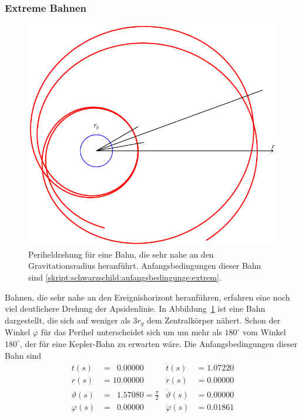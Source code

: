 \subsubsection{Extreme Bahnen}
\begin{figure}
\centering
\includegraphics{chapters/tikz/orbit2.pdf}
\caption{Periheldrehung für eine Bahn, die sehr nahe an den Gravitationsradius
heranführt.
Anfangsbedingungen dieser Bahn sind
\eqref{skript:schwarzschild:anfangsbedingunge:extrem}.
\label{skript:schwarzschild:apside:extrem}}
\end{figure}
Bahnen, die sehr nahe an den Ereignishorizont heranführen, erfahren eine
noch viel deutlichere Drehung der Apsidenlinie.
In Abbildung~\ref{skript:schwarzschild:apside:extrem}
ist eine Bahn dargestellt, die sich auf weniger als $3r_g$ dem Zentralkörper
nähert.
Schon der Winkel $\varphi$ für das Perihel unterscheidet sich um um mehr
als $180^\circ$ vom Winkel $180^\circ$, der für eine Kepler-Bahn zu
erwarten wäre.
Die Anfangsbedingungen dieser Bahn sind
\begin{equation}
\begin{aligned}
t(s)        &=\phantom{0}0.00000                    &\dot t(s)         &= 1.07220\\
r(s)        &=          10.00000                    &\dot r(s)         &= 0.00000\\
\vartheta(s)&=\phantom{0}1.57080=\textstyle\frac\pi2&\dot \vartheta(s) &= 0.00000\\
\varphi(s)  &=\phantom{0}0.00000                    &\dot \varphi(s)   &= 0.01861
\end{aligned}
\label{skript:schwarzschild:anfangsbedingunge:extrem}
\end{equation}
